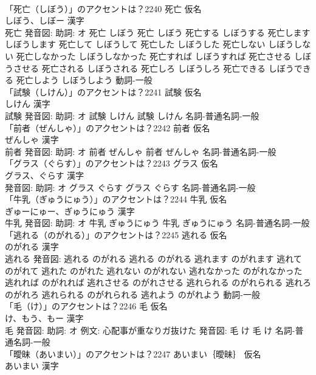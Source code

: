 \documentclass[8pt]{extreport}
\begin{document}
\begin{CJK}{UTF8}{min}
\\	「死亡（しぼう）」のアクセントは？2240	死亡 仮名　
\\	しぼう、しぼー 漢字　
\\	死亡 発音図: 助詞: オ	死亡 しぼう		死亡 しぼう 死亡する しぼうする 死亡します しぼうします 死亡して しぼうして 死亡した しぼうした 死亡しない しぼうしない 死亡しなかった しぼうしなかった 死亡すれば しぼうすれば 死亡させる しぼうさせる 死亡される しぼうされる 死亡しろ しぼうしろ 死亡できる しぼうできる 死亡しよう しぼうしよう				動詞-一般 
\\	「試験（しけん）」のアクセントは？2241	試験 仮名　
\\	しけん 漢字　
\\	試験 発音図: 助詞: オ	試験 しけん		試験 しけん				名詞-普通名詞-一般 
\\	「前者（ぜんしゃ）」のアクセントは？2242	前者 仮名　
\\	ぜんしゃ 漢字　
\\	前者 発音図: 助詞: オ	前者 ぜんしゃ		前者 ぜんしゃ				名詞-普通名詞-一般 
\\	「グラス（ぐらす）」のアクセントは？2243	グラス 仮名　
\\	グラス、ぐらす 漢字　
\\	発音図: 助詞: オ	グラス ぐらす		グラス ぐらす				名詞-普通名詞-一般 
\\	「牛乳（ぎゅうにゅう）」のアクセントは？2244	牛乳 仮名　
\\	ぎゅーにゅー、ぎゅうにゅう 漢字　
\\	牛乳 発音図: 助詞: オ	牛乳 ぎゅうにゅう		牛乳 ぎゅうにゅう				名詞-普通名詞-一般 
\\	「逃れる（のがれる）」のアクセントは？2245	逃れる 仮名　
\\	のがれる 漢字　
\\	逃れる 発音図:	逃れる のがれる		逃れる のがれる 逃れます のがれます 逃れて のがれて 逃れた のがれた 逃れない のがれない 逃れなかった のがれなかった 逃れれば のがれれば 逃れさせる のがれさせる 逃れられる のがれられる 逃れろ のがれろ 逃れられる のがれられる 逃れよう のがれよう				動詞-一般 
\\	「毛（け）」のアクセントは？2246	毛 仮名　
\\	け、もう、もー 漢字　
\\	毛 発音図: 助詞: オ 例文: 心配事が重なりガ抜けた 発音図:	毛 け		毛 け				名詞-普通名詞-一般 
\\	「曖昧（あいまい）」のアクセントは？2247	あいまい｛曖昧｝ 仮名　
\\	あいまい 漢字　

\end{CJK}
\end{document}
